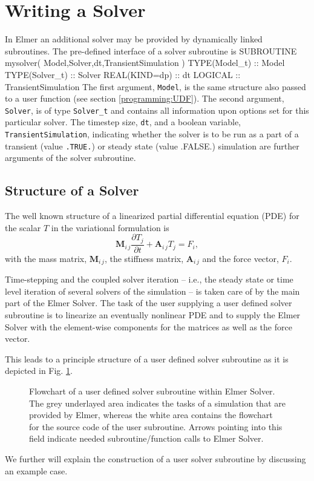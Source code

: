 \section{Writing a Solver\label{programming:howtosolver}}
In Elmer an additional solver may be provided by dynamically linked subroutines. The pre-defined interface of a solver subroutine is
\ttbegin
SUBROUTINE mysolver( Model,Solver,dt,TransientSimulation )
  TYPE(Model_t) :: Model
  TYPE(Solver_t) :: Solver
  REAL(KIND=dp) :: dt
  LOGICAL :: TransientSimulation
\ttend
The first argument, \texttt{Model}, is the same structure also passed to a user function (see section \ref{programming:UDF}). The second argument, \texttt{Solver}, is of type \texttt{Solver\_t} and contains all information upon options set for this particular solver. The timestep size, \texttt{dt}, and a boolean variable, \texttt{TransientSimulation}, indicating whether the solver is to be run as a part of a transient (value \texttt{.TRUE.}) or steady state (value .FALSE.) simulation are further arguments of the solver subroutine.
\subsection{Structure of a Solver\label{programming:solver_structure}}
The well known structure of a linearized partial differential equation (PDE) for the scalar $T$ in the variational formulation is
\begin{equation}\label{programming:variational}
\mathbf{M}_{i\,j}\frac{\partial T_{j}}{\partial t} + \mathbf{A}_{i\,j}T_{j} = F_{i},
\end{equation}
with the mass matrix, $\mathbf{M}_{i\,j}$, the stiffness matrix, $\mathbf{A}_{i\,j}$ and the force vector, $ F_{i}$. 

Time-stepping and the coupled solver iteration -- i.e., the steady state or time level iteration of several solvers of the simulation -- is taken care of by the main part of the Elmer Solver. The task of the user supplying a user defined solver subroutine is to linearize an eventually nonlinear PDE and to supply the Elmer Solver with the element-wise components for the matrices as well as the force vector. 

This leads to a principle structure of a user defined solver subroutine as it is depicted in Fig. \ref{fig:solverstructure}.
\begin{figure}[tbhp]
\begin{center}
\caption{\label{fig:solverstructure} Flowchart of a user defined solver subroutine within Elmer Solver. The grey underlayed area indicates the tasks of a simulation that are provided by Elmer, whereas the white area contains the flowchart for the source code of the user subroutine. Arrows pointing into this field indicate needed subroutine/function calls to Elmer Solver.}
\end{center}
\end{figure}
We further will explain the construction of a user solver subroutine by discussing an example case.

